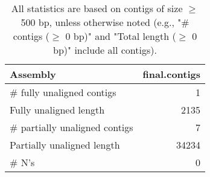 \documentclass[12pt,a4paper]{article}
\begin{document}
\begin{table}[ht]
\begin{center}
\caption{All statistics are based on contigs of size $\geq$ 500 bp, unless otherwise noted (e.g., "\# contigs ($\geq$ 0 bp)" and "Total length ($\geq$ 0 bp)" include all contigs).}
\begin{tabular}{|l*{1}{|r}|}
\hline
Assembly & final.contigs \\ \hline
\# fully unaligned contigs & 1 \\ \hline
Fully unaligned length & 2135 \\ \hline
\# partially unaligned contigs & 7 \\ \hline
Partially unaligned length & 34234 \\ \hline
\# N's & 0 \\ \hline
\end{tabular}
\end{center}
\end{table}
\end{document}
